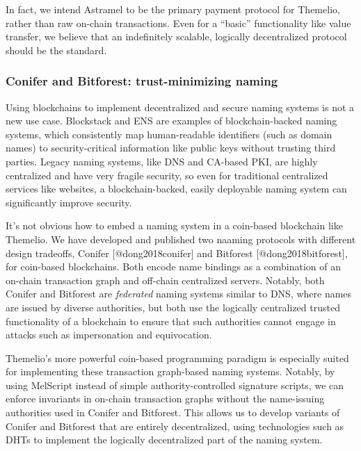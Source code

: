 \documentclass[]{article}
\begin{document}
In fact, we intend Astramel to be the primary payment protocol for
Themelio, rather than raw on-chain transactions. Even for a ``basic''
functionality like value transfer, we believe that an indefinitely
scalable, logically decentralized protocol should be the standard.

\hypertarget{conifer-and-bitforest-trust-minimizing-naming}{%
\subsubsection{Conifer and Bitforest: trust-minimizing
naming}\label{conifer-and-bitforest-trust-minimizing-naming}}

Using blockchains to implement decentralized and secure naming systems
is not a new use case. Blockstack and ENS are examples of
blockchain-backed naming systems, which consistently map human-readable
identifiers (such as domain names) to security-critical information like
public keys without trusting third parties. Legacy naming systems, like
DNS and CA-based PKI, are highly centralized and have very fragile
security, so even for traditional centralized services like websites, a
blockchain-backed, easily deployable naming system can significantly
improve security.

It's not obvious how to embed a naming system in a coin-based blockchain
like Themelio. We have developed and published two naaming protocols
with different design tradeoffs, Conifer {[}@dong2018conifer{]} and
Bitforest {[}@dong2018bitforest{]}, for coin-based blockchains. Both
encode name bindings as a combination of an on-chain transaction graph
and off-chain centralized servers. Notably, both Conifer and Bitforest
are \emph{federated} naming systems similar to DNS, where names are
issued by diverse authorities, but both use the logically centralized
trusted functionality of a blockchain to ensure that such authorities
cannot engage in attacks such as impersonation and equivocation.

Themelio's more powerful coin-based programming paradigm is especially
suited for implementing these transaction graph-based naming systems.
Notably, by using MelScript instead of simple authority-controlled
signature scripts, we can enforce invariants in on-chain transaction
graphs without the name-issuing authorities used in Conifer and
Bitforest. This allows us to develop variants of Conifer and Bitforest
that are entirely decentralized, using technologies such as DHTs to
implement the logically decentralized part of the naming system.
\end{document}
